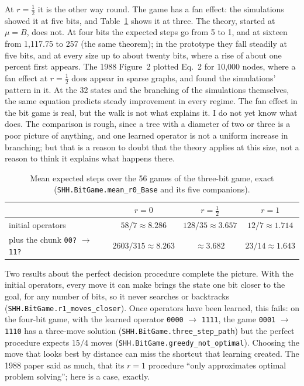\documentclass[11pt]{article}
\newcommand{\lean}[1]{\texttt{#1}}
\newcommand{\code}[1]{\texttt{#1}}
\begin{document}
At $r = \tfrac12$ it is the other way round. The game has a fan effect:
the simulations showed it at five bits, and Table~\ref{tab:game} shows it
at three. The theory, started at $\mu = B$, does not. At four bits the
expected steps go from 5 to 1, and at sixteen from 1{,}117.75 to 257 (the
same theorem); in the prototype they fall steadily at five bits, and at
every size up to about twenty bits, where a rise of about one percent
first appears. The 1988 Figure~2 plotted Eq.~2 for 10{,}000 nodes, where a
fan effect at $r = \tfrac12$ does appear in sparse graphs, and found the
simulations' pattern in it. At the 32 states and the branching of the
simulations themselves, the same equation predicts steady improvement in
every regime. The fan effect in the bit game is real, but the walk is not
what explains it. I do not yet know what does. The comparison is rough,
since a tree with a diameter of two or three is a poor picture of
anything, and one learned operator is not a uniform increase in branching;
but that is a reason to doubt that the theory applies at this size, not a
reason to think it explains what happens there.

\begin{table}[H]
\centering\small
\begin{tabular}{@{}lccc@{}}
\toprule
& $r = 0$ & $r = \tfrac12$ & $r = 1$ \\
\midrule
initial operators & $58/7 \approx 8.286$ & $128/35 \approx 3.657$ & $12/7 \approx 1.714$ \\
plus the chunk \code{00?} $\to$ \code{11?} & $2603/315 \approx 8.263$ & $\approx 3.682$ & $23/14 \approx 1.643$ \\
\bottomrule
\end{tabular}
\caption{Mean expected steps over the 56 games of the three-bit game,
exact (\lean{SHH.BitGame.mean\_r0\_Base} and its five companions).}
\label{tab:game}
\end{table}

Two results about the perfect decision procedure complete the picture. With
the initial operators, every move it can make brings the state one bit
closer to the goal, for any number of bits, so it never searches or
backtracks (\lean{SHH.BitGame.r1\_moves\_closer}). Once operators have been
learned, this fails: on the four-bit game, with the learned operator
\code{0000} $\to$ \code{1111}, the game \code{0001} $\to$ \code{1110} has a
three-move solution (\lean{SHH.BitGame.three\_step\_path}) but the perfect
procedure expects $15/4$ moves (\lean{SHH.BitGame.greedy\_not\_optimal}).
Choosing the move that looks best by distance can miss the shortcut that
learning created. The 1988 paper said as much, that its $r = 1$ procedure
``only approximates optimal problem solving''; here is a case, exactly.
\end{document}

